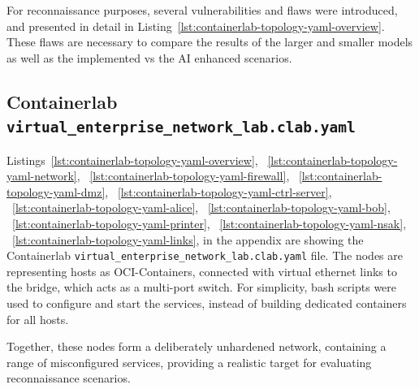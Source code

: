 For reconnaissance purposes, several vulnerabilities and flaws were introduced, and presented in detail in Listing~\ref{lst:containerlab-topology-yaml-overview}.
These flaws are necessary to compare the results of the larger and smaller models as well as the implemented vs the \gls{AI} enhanced scenarios.

\subsection{\gls{Containerlab} \texttt{virtual_enterprise_network_lab.clab.yaml}}\label{subsec:contairlab-topology-yaml}

Listings~\ref{lst:containerlab-topology-yaml-overview},
~\ref{lst:containerlab-topology-yaml-network},
~\ref{lst:containerlab-topology-yaml-firewall},
~\ref{lst:containerlab-topology-yaml-dmz},
~\ref{lst:containerlab-topology-yaml-ctrl-server},
~\ref{lst:containerlab-topology-yaml-alice},
~\ref{lst:containerlab-topology-yaml-bob},
~\ref{lst:containerlab-topology-yaml-printer},
~\ref{lst:containerlab-topology-yaml-nsak},
~\ref{lst:containerlab-topology-yaml-links},
in the appendix are showing the \gls{Containerlab} \texttt{virtual_enterprise_network_lab.clab.yaml} file.
The nodes are representing hosts as \glspl{OCI-Container},
connected with virtual ethernet links to the bridge, which acts as a multi-port switch.
For simplicity, bash scripts were used to configure and start the services,
instead of building dedicated containers for all hosts.

Together, these nodes form a deliberately unhardened network, containing a range of misconfigured services,
providing a realistic target for evaluating reconnaissance scenarios.
